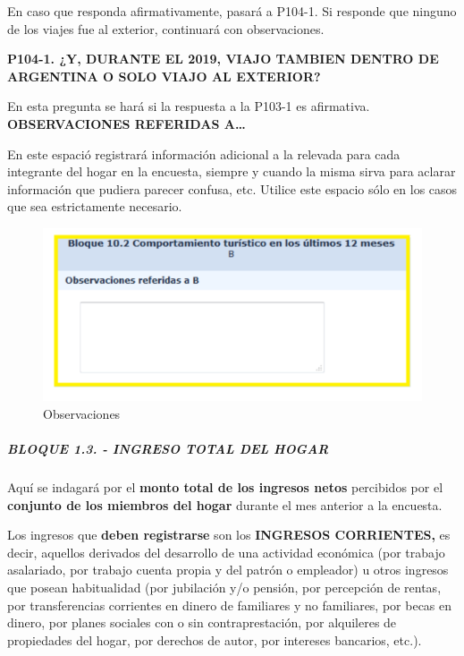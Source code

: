 \documentclass[
  openany]{book}
\begin{document}
En caso que responda afirmativamente, pasará a P104-1. Si responde que ninguno de los viajes fue al exterior, continuará con observaciones.

\textbf{P104-1. ¿Y, DURANTE EL 2019, VIAJO TAMBIEN DENTRO DE ARGENTINA O SOLO VIAJO AL EXTERIOR?}

En esta pregunta se hará si la respuesta a la P103-1 es afirmativa. \textbf{OBSERVACIONES REFERIDAS A\ldots{}}

En este espació registrará información adicional a la relevada para cada integrante del hogar en la encuesta, siempre y cuando la misma sirva para aclarar información que pudiera parecer confusa, etc. Utilice este espacio sólo en los casos que sea estrictamente necesario.

\begin{figure}

{\centering \includegraphics[width=1\linewidth]{imagenes/figura6-60} 

}

\caption{Observaciones}\label{fig:bloque10}
\end{figure}

\hypertarget{bloque-1.3.---ingreso-total-del-hogar}{%
\subparagraph{\texorpdfstring{\textbf{BLOQUE 1.3. - INGRESO TOTAL DEL HOGAR}}{BLOQUE 1.3. - INGRESO TOTAL DEL HOGAR}}\label{bloque-1.3.---ingreso-total-del-hogar}}

Aquí se indagará por el \textbf{monto total de los ingresos netos} percibidos por el \textbf{conjunto de los miembros del hogar} durante el mes anterior a la encuesta.

Los ingresos que \textbf{deben registrarse} son los \textbf{INGRESOS CORRIENTES,} es decir, aquellos derivados del desarrollo de una actividad económica (por trabajo asalariado, por trabajo cuenta propia y del patrón o empleador) u otros ingresos que posean habitualidad (por jubilación y/o pensión, por percepción de rentas, por transferencias corrientes en dinero de familiares y no familiares, por becas en dinero, por planes sociales con o sin contraprestación, por alquileres de propiedades del hogar, por derechos de autor, por intereses bancarios, etc.).
\end{document}
